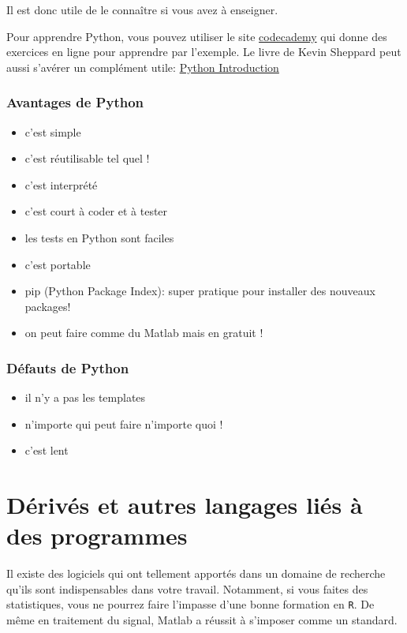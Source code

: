 Il est donc utile de le connaître si vous avez à enseigner.

Pour apprendre Python, vous pouvez utiliser le site 
\href{http://www.codecademy.com/tracks/python}{codecademy} 
qui donne des exercices en ligne pour apprendre par l'exemple.
Le livre de Kevin Sheppard peut aussi s'avérer un compl\'ement utile: 
\href{http://www.kevinsheppard.com/images/0/09/Python_introduction.pdf}{Python Introduction}

\subsubsection*{Avantages de Python}
\begin{itemize}
\item c'est simple
\item c'est réutilisable tel quel ! 
\item c'est interprété
\item c'est court à coder et à  tester
\item les tests en Python sont faciles %
\item c'est portable
\item pip (Python Package Index): super pratique pour installer des nouveaux packages!
\item on peut faire comme du Matlab mais en gratuit ! %
\end{itemize}

\subsubsection*{Défauts de Python}
\begin{itemize}
\item il n'y a pas les templates
\item n'importe qui peut faire n'importe quoi ! %
\item c'est lent
\end{itemize}

\section{Dérivés et autres langages liés à des programmes}

Il existe des logiciels qui ont tellement apportés dans un domaine de recherche qu'ils sont 
indispensables dans votre travail. Notamment, si vous faites des statistiques, vous ne pourrez
 faire l'impasse d'une bonne formation en \lstinline+R+. De m\^eme en traitement du signal, 
Matlab a réussit à s'imposer comme un standard.\\

